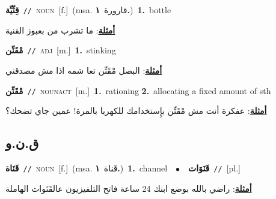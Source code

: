 \documentclass[10pt,a4paper,twoside]{article} %
\begin{document}
\begin{multicols}{2}
{\setlength\topsep{0pt}\textbf{\foreignlanguage{arabic}{قِنِّيِّة}}\ {\color{gray}\texttt{//}\color{black}}\ \textsc{noun}\ [f.]\ \color{gray}(msa. \foreignlanguage{arabic}{قارورة}~\foreignlanguage{arabic}{\textbf{١.}})\color{black}\ \textbf{1.}~bottle\  \begin{flushright}\color{gray}\foreignlanguage{arabic}{\textbf{\underline{\foreignlanguage{arabic}{أمثلة}}}: ما تشرب من بعبوز القنية}\end{flushright}\color{black}} \vspace{2mm}

{\setlength\topsep{0pt}\textbf{\foreignlanguage{arabic}{مْقَنِّن}}\ {\color{gray}\texttt{//}\color{black}}\ \textsc{adj}\ [m.]\ \textbf{1.}~stinking\  \begin{flushright}\color{gray}\foreignlanguage{arabic}{\textbf{\underline{\foreignlanguage{arabic}{أمثلة}}}: البصل مْقَنِّن تعا شمه اذا مش مصدقني}\end{flushright}\color{black}} \vspace{2mm}

{\setlength\topsep{0pt}\textbf{\foreignlanguage{arabic}{مْقَنِّن}}\ {\color{gray}\texttt{//}\color{black}}\ \textsc{noun\textunderscore act}\ [m.]\ \textbf{1.}~rationing  \textbf{2.}~allocating a fixed amount of sth\  \begin{flushright}\color{gray}\foreignlanguage{arabic}{\textbf{\underline{\foreignlanguage{arabic}{أمثلة}}}: عفكرة أنت مش مْقَنِّن بإِستخدامك للكهربا بالمرة! عمين جاي تضحك؟}\end{flushright}\color{black}} \vspace{2mm}

\vspace{-3mm}
\subsection*{\color{blue}\foreignlanguage{arabic}{ق.ن.و}\color{blue}{}} 

{\setlength\topsep{0pt}\textbf{\foreignlanguage{arabic}{قَنَاة}}\ {\color{gray}\texttt{//}\color{black}}\ \textsc{noun}\ [f.]\ \color{gray}(msa. \foreignlanguage{arabic}{قَناة}~\foreignlanguage{arabic}{\textbf{١.}})\color{black}\ \textbf{1.}~channel\ \ $\bullet$\ \ \setlength\topsep{0pt}\textbf{\foreignlanguage{arabic}{قَنَوَات}}\ {\color{gray}\texttt{//}\color{black}}\ [pl.]\  \begin{flushright}\color{gray}\foreignlanguage{arabic}{\textbf{\underline{\foreignlanguage{arabic}{أمثلة}}}: راضي بالله بوضع ابنك 24 ساعة فاتح التلفيزيون عالقَنَوات الهاملة}\end{flushright}\color{black}} \vspace{2mm}


\end{multicols}
\end{document}
